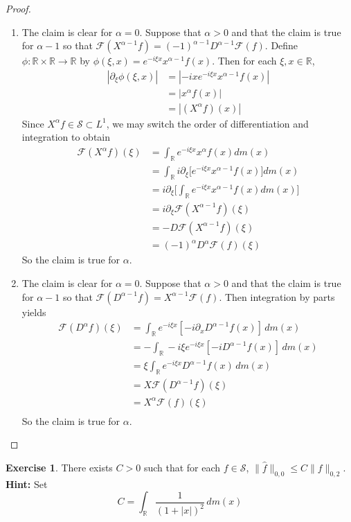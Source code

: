 \documentclass[12pt]{amsart}
\theoremstyle{definition}
\newtheorem{ex}[definition]{Exercise}
\newcommand{\p}{\partial}
\newcommand{\al}{\alpha}
\newcommand{\R}{\mathbb{R}}
\newcommand{\MF}{\mathcal{F}}
\newcommand{\MS}{\mathcal{S}}
\newcommand{\dm}{\, d m}
\begin{document}
	\begin{proof}\
		\begin{enumerate}
			\item The claim is clear for $\al = 0$. Suppose that $\al > 0$ and that the claim is true for $\al -1$ so that $\MF(X^{\al-1}f) = (-1)^{\al-1}D^{\al-1} \MF(f)$. Define $\phi:\R \times \R \rightarrow \R$ by $\phi(\xi, x) = e^{-i\xi x} x^{\al - 1}f(x)$. Then for each $\xi, x \in \R$, 
			\begin{align*}
				|\p_{\xi} \phi(\xi, x)|
				& = |-ix e^{-i\xi x} x^{\al - 1}f(x)| \\
				& = |x^{\al}f(x)| \\
				& = |(X^{\al}f)(x)|
			\end{align*}
			Since $X^{\al}f \in \MS \subset L^1$, we may switch the order of differentiation and integration to obtain 
			\begin{align*}
				\MF(X^{\al}f) (\xi)
				& = \int_{\R} e^{-i\xi x}x^{\al}f(x) dm(x) \\
				& = \int_{\R} i \p_{\xi}\bigg[ e^{-i\xi x}x^{\al-1}f(x) \bigg] dm(x) \\
				& = i \p_{\xi} \bigg[  \int_{\R} e^{-i\xi x}x^{\al-1}f(x) dm(x) \bigg] \\
				& = i \p_{\xi} \MF(X^{\al-1}f) (\xi) \\
				& = -D \MF(X^{\al-1}f)(\xi) \\
				& = (-1)^{\al}D^{\al} \MF(f) (\xi)
			\end{align*}
			So the claim is true for $\al$.
			\item The claim is clear for $\al = 0$. Suppose that $\al > 0$ and that the claim is true for $\al -1$ so that $\MF(D^{\al-1}f) = X^{\al-1} \MF(f)$. Then integration by parts yields 
			\begin{align*}
				\MF(D^{\al}f)(\xi)
				& = \int_{\R} e^{-i \xi x} [-i \p_x D^{\al-1}f(x)] \dm(x) \\
				&= - \int_{\R} -i \xi e^{-i \xi x} [-iD^{\al-1}f(x)] \dm(x) \\
				&= \xi \int_{\R}   e^{-i \xi x} D^{\al-1}f(x) \dm(x) \\
				&= X \MF(D^{\al-1}f)(\xi) \\
				&= X^{\al} \MF(f)(\xi) \\
			\end{align*}
			So the claim is true for $\al$.
		\end{enumerate}
	\end{proof}

	\begin{ex}
		There exists $C >0$ such that for each $f \in \MS$, $\|\hat{f}\|_{0,0} \leq C \|f\|_{0, 2}$.\\
		\textbf{Hint:} Set $$C = \int_{\R} \frac{1}{(1+|x|)^2} \dm(x)$$
	\end{ex}
	
\end{document}
